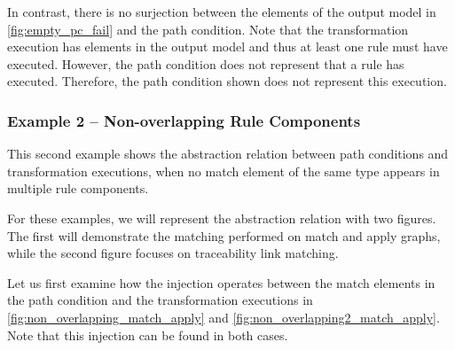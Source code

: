 In contrast, there is no surjection between the elements of the output model in \cref{fig:empty_pc_fail} and the path condition. Note that the transformation execution has elements in the output model and thus at least one rule must have executed. However, the path condition does not represent that a rule has executed. Therefore, the path condition shown does not represent this execution. 




\subsubsection{Example 2 -- Non-overlapping Rule Components}


This second example shows the abstraction relation between path conditions and transformation executions, when no match element of the same type appears in multiple rule components.

For these examples, we will represent the abstraction relation with two figures. The first will demonstrate the matching performed on match and apply graphs, while the second figure focuses on traceability link matching.

Let us first examine how the injection operates between the match elements in the path condition and the transformation executions in \cref{fig:non_overlapping_match_apply} and \cref{fig:non_overlapping2_match_apply}. Note that this injection can be found in both cases.

